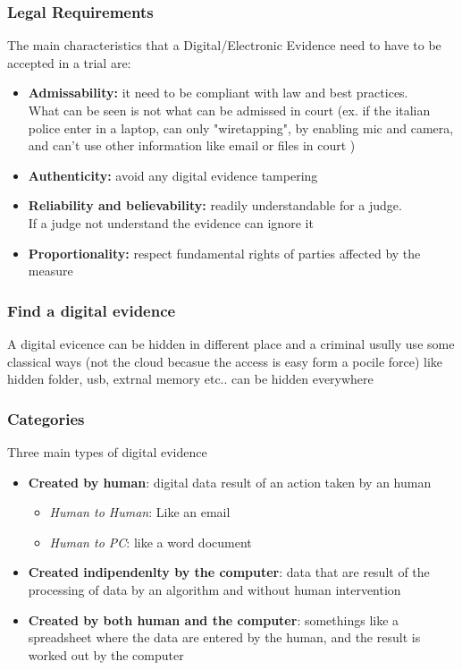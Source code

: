 \subsubsection{Legal Requirements}
The main characteristics that a Digital/Electronic Evidence need to have to be accepted in a trial are:
\begin{itemize}
    \item \textbf{Admissability:} it need to be compliant with law and best practices. \\ 
        What can be seen is not what can be admissed in court (ex. if the italian police enter in a laptop, 
        can only "wiretapping", by enabling mic and camera, 
        and can't use other information like email or files in court )
    \item \textbf{Authenticity:} avoid any digital evidence tampering
    \item \textbf{Reliability and believability:} readily understandable for a judge. \\
        If a judge not understand the evidence can ignore it
    \item \textbf{Proportionality:} respect fundamental rights of parties affected by the measure
\end{itemize}

\subsubsection{Find a digital evidence}
A digital evicence can be hidden in different place and a criminal usully use some classical ways 
(not the cloud becasue the access is easy form a pocile force)
like hidden folder, usb, extrnal memory etc.. can be hidden everywhere 

\subsubsection{Categories}
Three main types of digital evidence
\begin{itemize}
    \item \textbf{Created by human}: digital data result of an action taken by an human
    \begin{itemize}
        \item \textit{Human to Human}: Like an email
        \item \textit{Human to PC}: like a word document
    \end{itemize}
    \item \textbf{Created indipendenlty by the computer}: data that are result of 
    the processing of data by an algorithm and without human intervention
    \item \textbf{Created by both human and the computer}: somethings like a spreadsheet where the data 
    are entered by the human, and the result is worked out by the computer
\end{itemize}

